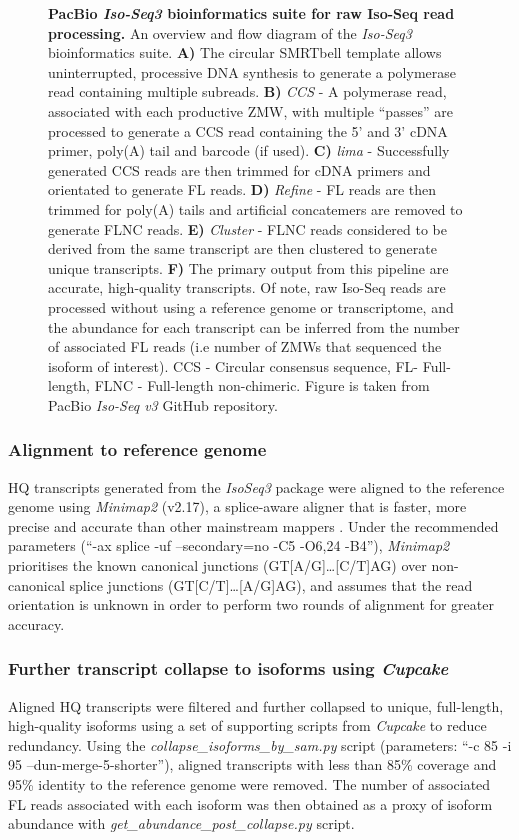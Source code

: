 \begin{figure}[htp]
	{\textbf{PacBio \textit{Iso-Seq3} bioinformatics suite for raw Iso-Seq read processing.} An overview and flow diagram of the \textit{Iso-Seq3} bioinformatics suite. \textbf{A)} The circular SMRTbell template allows uninterrupted, processive DNA synthesis to generate a polymerase read containing multiple subreads. \textbf{B)} \textit{CCS} - A polymerase read, associated with each productive ZMW, with multiple “passes” are processed to generate a CCS read containing the 5' and 3' cDNA primer, poly(A) tail and barcode (if used). \textbf{C)} \textit{lima} - Successfully generated CCS reads are then trimmed for cDNA primers and orientated to generate FL reads. \textbf{D)} \textit{Refine} - FL reads are then trimmed for poly(A) tails and artificial concatemers are removed to generate FLNC reads. \textbf{E)} \textit{Cluster} - FLNC reads considered to be derived from the same transcript are then clustered to generate unique transcripts. \textbf{F)} The primary output from this pipeline are accurate, high-quality transcripts. Of note, raw Iso-Seq reads are processed without using a reference genome or transcriptome, and the abundance for each transcript can be inferred from the number of associated FL reads (i.e number of ZMWs that sequenced the isoform of interest). CCS - Circular consensus sequence, FL- Full-length, FLNC - Full-length non-chimeric. Figure is taken from PacBio \textit{Iso-Seq v3} GitHub repository\cite{githubp}.}
	\label{fig:isoseq3_tool}
\end{figure}

\newpage
\subsubsection{Alignment to reference genome} 
HQ transcripts generated from the \textit{IsoSeq3} package were aligned to the reference genome using \textit{Minimap2}\cite{Li2018} (v2.17), a splice-aware aligner that is faster, more precise and accurate than other mainstream mappers \cite{SimirKriZanoviC2018,Tang2020}. Under the recommended parameters (“-ax splice -uf --secondary=no -C5 -O6,24 -B4”), \textit{Minimap2} prioritises the known canonical junctions (GT[A/G]…[C/T]AG) over non-canonical splice junctions (GT[C/T]…[A/G]AG), and assumes that the read orientation is unknown in order to perform two rounds of alignment for greater accuracy. 

\subsubsection{Further transcript collapse to isoforms using \textit{Cupcake}}
Aligned HQ transcripts were filtered and further collapsed to unique, full-length, high-quality isoforms using a set of supporting scripts from \textit{Cupcake} to reduce redundancy. Using the \textit{collapse\_isoforms\_by\_sam.py} script (parameters: “-c 85 -i 95 --dun-merge-5-shorter”), aligned transcripts with less than 85\% coverage and 95\% identity to the reference genome were removed. The number of associated FL reads associated with each isoform was then obtained as a proxy of isoform abundance with \textit{get\_abundance\_post\_collapse.py} script. 

